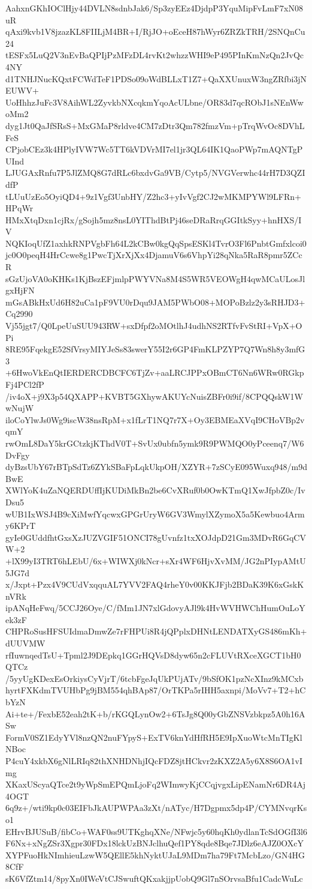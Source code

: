 AahxnGKhIOClHjy44DVLN8sdnbJak6/Sp3zyEEz4DjdpP3YquMipFvLmF7xN08uR
qAxi9kvb1V8jzazKL8FIILjM4BR+I/RjJO+oEceH87hWyr6ZRZkTRH/2SNQnCu24
tESFx5LuQ2V3nEvBaQPIjPzMFzDL4rvKt2whzzWHI9eP495PInKmNzQn2JvQc4NY
d1TNHJNucKQxtFCWdTeF1PDSo09oWdBLLxT1Z7+QaXXUnuxW3ngZRfbi3jNEUWV+
UoHhhzJuFc3V8AihWL2ZyvkbNXcqkmYqoAcULbne/OR83d7qcRObJ1sNEnWwoMm2
dyg1Jt0QaJfSRsS+MxGMaP8rldve4CM7zDtr3Qm782fmzVm+pTrqWvOc8DVhLFeS
CPjobCEz3k4HPlyIVW7Wc5TT6kVDVrMI7el1jr3QL64IK1QaoPWp7mAQNTgPUInd
LJUGAxRnfu7P5JlZMQ8G7dRLc6bxdvGa9VB/Cytp5/NVGVerwhc44rH7D3QZIdfP
tLUuUzEo5OyiQD4+9z1Vgf3UnbHY/Z2hc3+yIvVgf2CJ2wMKMPYWl9LFRn+HPqWr
HMxXtqDxn1cjRx/gSojh5mz8nsL0YIThdBtPj46seDRaRrqGGItkSyy+hnHXS/IV
NQKIoqUfZ1axhkRNPVgbFh64L2kCBw0kgQqSpsESKl4TvrO3Fl6PnbtGmfxlcoi0
jc0O0peqH4HrCcwe8g1PwcTjXrXjXx4DjamuV6s6VhpYi28qNka5RaR8pmr5ZCcR
sGzUjoVA0oKHKs1KjBszEFjmlpPWYVNa8M4S5WR5VEOWgH4qwMCaULosJlgxHjFN
mGsABkHxUd6H82uCa1pF9VU0rDqu9JAM5PWbO08+MOPoBzlz2y3sRHJD3+Cq2990
Vj55jgt7/Q0LpeUuSUU943RW+sxDfpf2oMOtlhJ4udhNS2RTfvFvStRI+VpX+OPi
8RE95FqekgE52SfVrsyMIYJeSs83swerY55I2r6GP4FmKLPZYP7Q7Wn8h8y3mfG3
+6HwoVkEnQtIERDERCDBCFC6TjZv+aaLRCJPPxOBmCT6Nn6WRw0RGkpFj4PCl2fP
/iv4oX+j9X3p54QXAPP+KVBT5GXhywAKUYcNuisZBFr0i9if/8CPQQskW1WwNujW
iloCoYlwJs0Wg9iscW38nsRpM+x1fLrT1NQ7r7X+Oy3EBMEaXVqI9CHoVBp2vqmY
rwOmL8DaY5krGCtzkjKThdV0T+SvUx0ubfn5ymk9R9PWMQO0yPceenq7/W6DvFgy
dyBzsUbY67rBTpSdTz6ZYkSBaFpLqkUkpOH/XZYR+7zSCyE095Wuxq948/m9dBwE
XWlYoK4uZaNQERDUffIjKUDiMkBn2be6CvXRuf0b0OwKTmQ1XwJfpbZ0c/IvDsu5
wUB1IxWSJ4B9cXiMwfYqcwxGPGrUryW6GV3WmylXZymoX5a5Kewbuo4Army6KPrT
gyIe0GUddfhtGxsXzJUZVGIF51ONCI78gUvnfz1txXOJdpD21Gm3MDvR6GqCVW+2
+lX99yI3TRT6hLEbU/6x+WIWXj0kNcr+sXr4WF6HjvXvMM/JG2nPIypAMtU5JG7d
x/Jxpt+Pzx4V9CUdVxqquAL7YVV2FAQ4rheY0v00KKJFjb2BDaK39K6xGskKnVRk
ipANqHeFwq/5CCJ26Oye/C/fMm1JN7xlGdovyAJl9k4HvWVHWChHumOuLoYek3zF
CHPRoSusHFSUIdmaDmwZe7rFHPUi8R4jQPplxDHNtLENDATXyGS486mKh+dUUVMW
rfIuwnqedTsU+Tpml2J9DEpkq1GGrHQVsD8dyw65n2cFLUVtRXceXGCT1bH0QTCz
/5yyUgKDexEsOrkiysCyVjrT/6tcbFgeJqUkPUjATv/9bSfOK1pzNcXInz9kMCxb
hyrtFXKdmTVUHbPg9jBM554qhBAp87/OrTKPa5rIHH5axnpi/MoVv7+T2+hCbYzN
Ai+te+/FexbE52eah2tK+b/rKGQLynOw2+6TsJg8Q00yGbZNSVzbkpz5A0h16ASw
FormV0SZ1EdyYVl8nzQN2nuFYpyS+ExTV6knYdHfRH5E9IpXuoWtcMnTIgKlNBoc
P4cuY4xkbX6gNlLRIq82thXNHDNhjIQcFDZ8jtHCkvr2zKXZ2A5y6X8S6OA1vImg
XKaxUScyaQTce2t9yWpSmEPQmLjoFq2WImwyKjCCqjvgxLipENamNr6DR4Aj4OGT
6q9z+/wti9kp0c03EIFbJkAUPWPAa3zXt/nATyc/H7Dgpmx5dp4P/CYMNvqrKso1
EHrvBJUSuB/fibCo+WAF0ss9UTKghqXNe/NFwjc5y60hqKh0ydlanTcSdOGfI3l6
F6Nx+xNgZSr3Xgpr30FDx18lckUzBNJclhuQef1PY8qde8Bqe7JDlz6eAJZ0OXcY
XYPFuoHkNImhieuLzwW5QEllE5khNyktUJaL9MDm7ha79Ft7McbLzo/GN4HG8CfF
sK6VfZtm14/8pyXn0IWeVtCJSwuftQKxakjjpUobQ9Gl7nSOrvsaBfu1CadcWuLc
